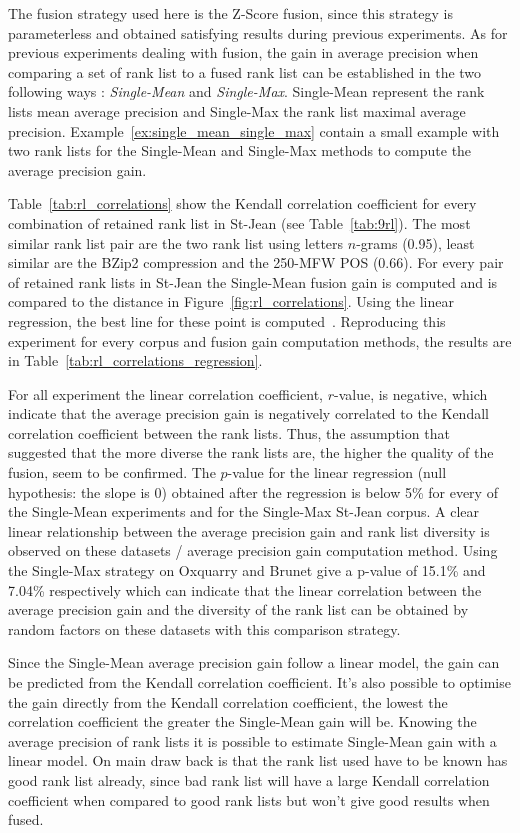 The fusion strategy used here is the Z-Score fusion, since this strategy is parameterless and obtained satisfying results during previous experiments.
As for previous experiments dealing with fusion, the gain in average precision when comparing a set of rank list to a fused rank list can be established in the two following ways : \textit{Single-Mean} and \textit{Single-Max}.
Single-Mean represent the rank lists mean average precision and Single-Max the rank list maximal average precision.
Example~\ref{ex:single_mean_single_max} contain a small example with two rank lists for the Single-Mean and Single-Max methods to compute the average precision gain.

Table~\ref{tab:rl_correlations} show the Kendall correlation coefficient for every combination of retained rank list in St-Jean (see Table~\ref{tab:9rl}).
The most similar rank list pair are the two rank list using letters $n$-grams (0.95), least similar are the BZip2 compression and the 250-MFW POS (0.66).
For every pair of retained rank lists in St-Jean the Single-Mean fusion gain is computed and is compared to the distance in Figure~\ref{fig:rl_correlations}.
Using the linear regression, the best line for these point is computed~\cite{scipy}.
Reproducing this experiment for every corpus and fusion gain computation methods, the results are in Table~\ref{tab:rl_correlations_regression}.

For all experiment the linear correlation coefficient, $r$-value, is negative, which indicate that the average precision gain is negatively correlated to the Kendall correlation coefficient between the rank lists.
Thus, the assumption that suggested that the more diverse the rank lists are, the higher the quality of the fusion, seem to be confirmed.
The $p$-value for the linear regression (null hypothesis: the slope is 0) obtained after the regression is below 5\% for every of the Single-Mean experiments and for the Single-Max St-Jean corpus.
A clear linear relationship between the average precision gain and rank list diversity is observed on these datasets / average precision gain computation method.
Using the Single-Max strategy on Oxquarry and Brunet give a p-value of 15.1\% and 7.04\% respectively which can indicate that the linear correlation between the average precision gain and the diversity of the rank list can be obtained by random factors on these datasets with this comparison strategy.

Since the Single-Mean average precision gain follow a linear model, the gain can be predicted from the Kendall correlation coefficient. It's also possible to optimise the gain directly from the Kendall correlation coefficient, the lowest the correlation coefficient the greater the Single-Mean gain will be.
Knowing the average precision of rank lists it is possible to estimate Single-Mean gain with a linear model.
On main draw back is that the rank list used have to be known has good rank list already, since bad rank list will have a large Kendall correlation coefficient when compared to good rank lists but won't give good results when fused.

